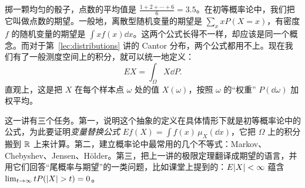 \label{lec:expectation}

掷一颗均匀的骰子，点数的平均值是 $\frac{1+2+\cdots+6}6=3.5$。在初等概率论中，我们把它叫做点数的期望。一般地，离散型随机变量的期望是 $\sum_xxP(X=x)$，有密度 $f$ 的随机变量的期望是 $\int xf(x)\dd x$。这两个公式长得不一样，却应该是同一个概念。而对于第~\ref{lec:distributions} 讲的 Cantor 分布，两个公式都用不上。现在我们有了一般测度空间上的积分，就可以统一地定义：
\[
EX=\int_\Omega X\dd P .
\]
直观上，这是把 $X$ 在每个样本点 $\omega$ 处的值 $X(\omega)$，按照 $\omega$ 的“权重” $P(\dd\omega)$ 加权平均。

这一讲有三个任务。第一，说明这个抽象的定义在具体情形下就是初等概率论中的公式，为此要证明\emph{变量替换公式} $Ef(X)=\int f(x)\,\mu_X(\dd x)$，它把 $\Omega$ 上的积分搬到 $\mathbb{R}$ 上来计算。第二，建立概率论中最常用的几个不等式：Markov、Chebyshev、Jensen、Hölder。第三，把上一讲的极限定理翻译成期望的语言，并用它们回答“尾概率与期望”的一类问题，比如课堂上提到的：$E\lvert X\rvert<\infty$ 蕴含 $\lim_{t\to\infty}tP(\lvert X\rvert>t)=0$。


